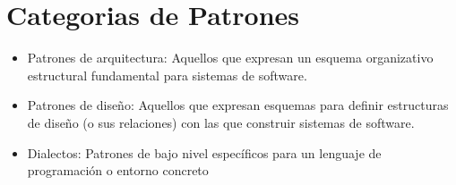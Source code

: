 \documentclass[10pt]{article}
\begin{document}
\section{Categorias de Patrones}
\begin{itemize}

\item Patrones de arquitectura: Aquellos que expresan un esquema organizativo estructural fundamental para 
sistemas de software.
\item Patrones de diseño: Aquellos que expresan esquemas para definir estructuras de diseño (o sus relaciones) 
con las que construir sistemas de software.
\item Dialectos: Patrones de bajo nivel específicos para un lenguaje de programación o entorno concreto
\end{itemize}

\newpage
\end{document}
